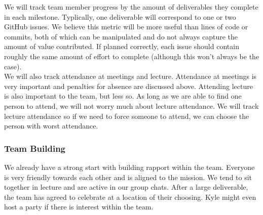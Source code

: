 \documentclass{article}
\begin{document}
We will track team member progress by the amount of deliverables they complete in each milestone. Typlically, one deliverable will correspond to one or two 
GitHub issues. We believe this metric will be more useful than lines of code or commits, both of which can be manipulated and do not always capture the 
amount of value contributed. If planned correctly, each issue should contain roughly the same amount of effort to complete (although this won't always be the case).\\

We will also track attendance at meetings and lecture. Attendance at meetings is very important and penalties for absence are discussed above. Attending lecture is
also important to the team, but less so. As long as we are able to find one person to attend, we will not worry much about lecture attendance. We will 
track lecture attendance so if we need to force someone to attend, we can choose the person with worst attendance.




\subsubsection*{Team Building}

We already have a strong start with building rapport within the team. 
Everyone is very friendly towards each other and is aligned to the mission. We tend to sit together in lecture and are active in our group chats. 
After a large deliverable, the team has agreed to celebrate at a location of their choosing. Kyle might even host a party if there is interest within the team.

\end{document}

